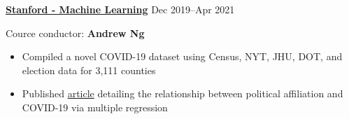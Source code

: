 \textbf{\href{https://www.coursera.org/account/accomplishments/verify/636WHFRBMH5V}{Stanford - Machine Learning}} \hfill Dec 2019--Apr 2021 \par
Cource conductor: \textbf{Andrew Ng}
\begin{itemize}
	\item Compiled a novel COVID-19 dataset using Census, NYT, JHU, DOT, and election data for 3,111 counties
	\item Published \href{https://econreview.berkeley.edu/partisanship-and-covid-19-response/}{article} detailing the relationship between political affiliation and COVID-19 via multiple regression
\end{itemize}\vspace{0.1cm} \par